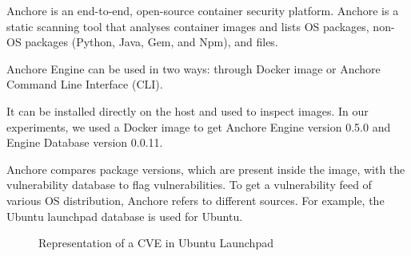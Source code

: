 \documentclass[a4paper,num-refs]{oup-contemporary}
\begin{document}
Anchore is an end-to-end, open-source container security platform. Anchore
is a static
scanning tool that analyses container images and lists OS
packages, non-OS packages (Python, Java, Gem, and Npm), and files.

Anchore Engine can be used in two ways: through Docker image or Anchore
Command Line Interface (CLI).

It can be
installed directly on the host and used to inspect images.
In our experiments, we used a Docker image to get Anchore Engine version 0.5.0 and Engine Database
version 0.0.11.

Anchore compares package versions, which are present inside the
image, with the vulnerability database to flag vulnerabilities.
To get a vulnerability feed of various OS distribution, Anchore refers to
different sources. For example, the Ubuntu launchpad database is used for Ubuntu.

\begin{figure}
        \caption{\label{example} Representation of a CVE in Ubuntu Launchpad}
\end{figure}
\end{document}

